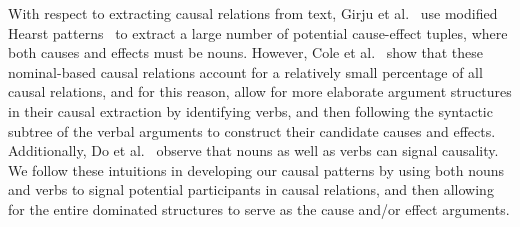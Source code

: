




With respect to extracting causal relations from text, Girju et al.~ use modified Hearst patterns~\cite{hearst1992automatic} to extract a large number of potential cause-effect tuples, where both causes and effects must be nouns.
However, Cole et al.~ show that these nominal-based causal relations account for a relatively small percentage of all causal relations, 
and for this reason, \cite{yang2014multi} allow for more elaborate argument structures in their causal extraction by identifying verbs, and then following the syntactic subtree of the verbal arguments to construct their candidate causes and effects. %
Additionally, Do et al.~ observe that nouns as well as verbs can signal causality.  
We follow these intuitions in developing our causal patterns by using both nouns and verbs to signal potential participants in causal relations, and then allowing for the entire dominated structures to serve as the cause and/or effect arguments.


